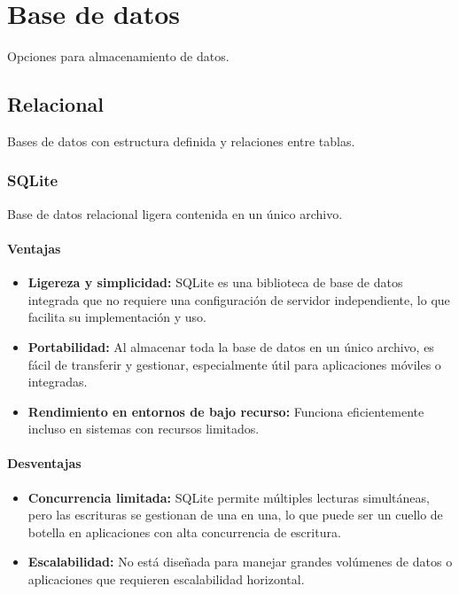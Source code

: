 \clearpage
\section{Base de datos}
Opciones para almacenamiento de datos.

\subsection{Relacional}
Bases de datos con estructura definida y relaciones entre tablas.

\subsubsection{SQLite}
Base de datos relacional ligera contenida en un único archivo.

\paragraph{Ventajas}
\begin{itemize}
    \item \textbf{Ligereza y simplicidad:} SQLite es una biblioteca de base de datos integrada que no requiere una configuración de servidor independiente, lo que facilita su implementación y uso.
    
    \item \textbf{Portabilidad:} Al almacenar toda la base de datos en un único archivo, es fácil de transferir y gestionar, especialmente útil para aplicaciones móviles o integradas.
    
    \item \textbf{Rendimiento en entornos de bajo recurso:} Funciona eficientemente incluso en sistemas con recursos limitados.
\end{itemize}

\paragraph{Desventajas}
\begin{itemize}
    \item \textbf{Concurrencia limitada:} SQLite permite múltiples lecturas simultáneas, pero las escrituras se gestionan de una en una, lo que puede ser un cuello de botella en aplicaciones con alta concurrencia de escritura.
    
    \item \textbf{Escalabilidad:} No está diseñada para manejar grandes volúmenes de datos o aplicaciones que requieren escalabilidad horizontal.
\end{itemize}

